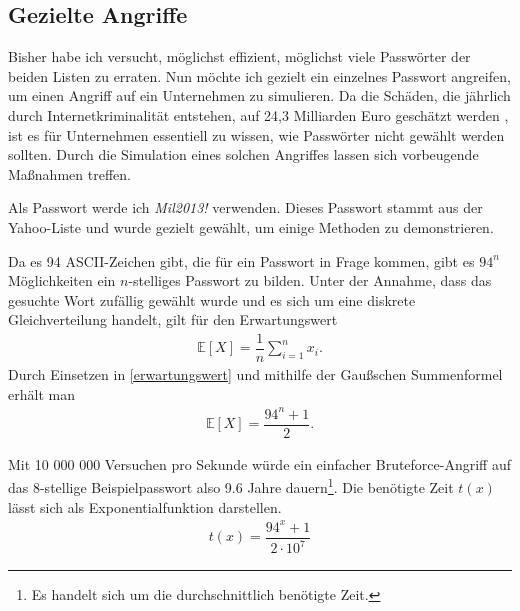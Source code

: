 \documentclass[12pt,a4paper]{scrartcl}
\newcommand{\spar}{\par\vspace{10pt}\noindent}
\numberwithin{equation}{section}
\numberwithin{myalgctr}{section}
\numberwithin{mytheoremctr}{section}
\begin{document}
	\subsection{Gezielte Angriffe}
	Bisher habe ich versucht, möglichst effizient, möglichst viele Passwörter der beiden Listen zu erraten. Nun möchte ich gezielt ein einzelnes Passwort angreifen, um einen Angriff auf ein Unternehmen zu simulieren. Da die Schäden, die jährlich durch Internetkriminalität entstehen, auf 24,3 Milliarden Euro geschätzt werden \autocite[vgl.][]{schaden}, ist es für Unternehmen essentiell zu wissen, wie Passwörter nicht gewählt werden sollten. Durch die Simulation eines solchen Angriffes lassen sich vorbeugende Maßnahmen treffen.
	\spar
	Als Passwort werde ich {\itshape Mil2013!} verwenden. Dieses Passwort stammt aus der Yahoo-Liste und wurde gezielt gewählt, um einige Methoden zu demonstrieren.
	\spar
	Da es 94 ASCII-Zeichen gibt, die für ein Passwort in Frage kommen, gibt es $94^n$ Möglichkeiten ein $n$-stelliges Passwort zu bilden. Unter der Annahme, dass das gesuchte Wort zufällig gewählt wurde und es sich um eine diskrete Gleichverteilung handelt, gilt für den Erwartungswert 
	\begin{align}
		\mathbb{E}[X]=\dfrac{1}{n} \sum^{n}_{i=1}{x_i}. \label{erwartungswert}
	\end{align}
	Durch Einsetzen in \eqref{erwartungswert} und mithilfe der Gaußschen Summenformel erhält man 
	\begin{align}
		\mathbb{E}[X]=\dfrac{94^n+1}{2}.
	\end{align}
	\spar
	Mit 10 000 000 Versuchen pro Sekunde würde ein einfacher Bruteforce-Angriff auf das 8-stellige Beispielpasswort also 9.6 Jahre dauern\footnote{Es handelt sich um die durchschnittlich benötigte Zeit.}. Die benötigte Zeit $t(x)$ lässt sich als Exponentialfunktion darstellen.
	\begin{align}
		t(x) = \dfrac{94^x+1}{2\cdot 10^{7}} \label{stdexp-zeit}
	\end{align}
	
\end{document}
